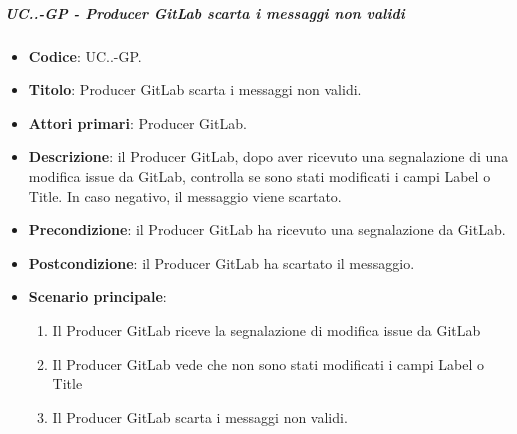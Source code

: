 		\subparagraph{UC\theuccount.\thesubuccount.\thesubsubuccount-GP - Producer GitLab scarta i messaggi non validi}
			
			\begin{itemize}
				\item \textbf{Codice}: UC\theuccount.\thesubuccount.\thesubsubuccount-GP.
				\item \textbf{Titolo}: Producer GitLab scarta i messaggi non validi.
				\item \textbf{Attori primari}: Producer GitLab.
				\item \textbf{Descrizione}: il Producer GitLab, dopo aver ricevuto una segnalazione di una modifica issue da GitLab, controlla
				se sono stati modificati i campi Label o Title. In caso negativo, il messaggio viene scartato.
				\item \textbf{Precondizione}: il Producer GitLab ha ricevuto una segnalazione da GitLab.
				\item \textbf{Postcondizione}: il Producer GitLab ha scartato il messaggio.
				\item \textbf{Scenario principale}: 
				\begin{enumerate}
					\item Il Producer GitLab riceve la segnalazione di modifica issue da GitLab
					\item Il Producer GitLab vede che non sono stati modificati i campi Label o Title
					\item Il Producer GitLab scarta i messaggi non validi.
				\end{enumerate}
			\end{itemize}